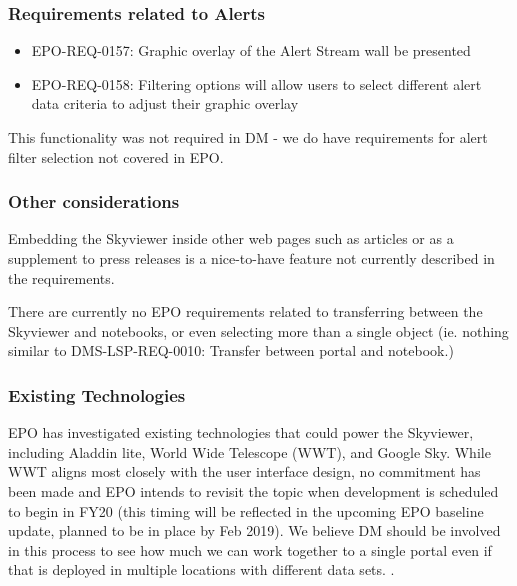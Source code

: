 \subsubsection{ Requirements related to Alerts}

\begin{itemize}
\item EPO-REQ-0157: Graphic overlay of the Alert Stream wall be presented

\item EPO-REQ-0158: Filtering options will allow users to select different alert data criteria to adjust their graphic overlay
\end{itemize}

This functionality was not required in  DM - we do have requirements for alert filter selection not covered in EPO.

\subsubsection{Other considerations}
Embedding the Skyviewer inside other web pages such as articles or as a supplement to press releases is a nice-to-have feature not currently described in the requirements.

There are currently no EPO requirements related to transferring between the Skyviewer and notebooks, or even selecting more than a single object (ie. nothing similar to DMS-LSP-REQ-0010: Transfer between portal and notebook.)

\subsubsection{Existing Technologies}

EPO has investigated existing technologies that could power the Skyviewer, including Aladdin lite, World Wide Telescope (WWT), and Google Sky. While WWT aligns most closely with the user interface design, no commitment has been made and EPO intends to revisit the topic when development is scheduled to begin in FY20 (this timing will be reflected in the upcoming EPO baseline update, planned to be in place by Feb 2019). We believe DM should be involved in this process to see how much we can work together to a single portal even  if that is deployed in multiple locations with different data sets. .
